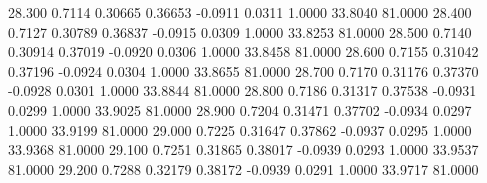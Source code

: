   28.300   0.7114   0.30665   0.36653  -0.0911   0.0311   1.0000  33.8040  81.0000
  28.400   0.7127   0.30789   0.36837  -0.0915   0.0309   1.0000  33.8253  81.0000
  28.500   0.7140   0.30914   0.37019  -0.0920   0.0306   1.0000  33.8458  81.0000
  28.600   0.7155   0.31042   0.37196  -0.0924   0.0304   1.0000  33.8655  81.0000
  28.700   0.7170   0.31176   0.37370  -0.0928   0.0301   1.0000  33.8844  81.0000
  28.800   0.7186   0.31317   0.37538  -0.0931   0.0299   1.0000  33.9025  81.0000
  28.900   0.7204   0.31471   0.37702  -0.0934   0.0297   1.0000  33.9199  81.0000
  29.000   0.7225   0.31647   0.37862  -0.0937   0.0295   1.0000  33.9368  81.0000
  29.100   0.7251   0.31865   0.38017  -0.0939   0.0293   1.0000  33.9537  81.0000
  29.200   0.7288   0.32179   0.38172  -0.0939   0.0291   1.0000  33.9717  81.0000
